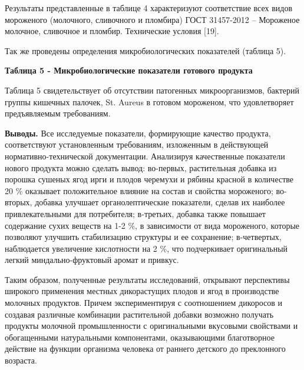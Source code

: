 {{Результаты представленные в таблице 4 характеризуют соответствие всех
видов мороженого (молочного, сливочного и пломбира) ГОСТ 31457-2012 --
Мороженое молочное, сливочное и пломбир. Технические условия {[}19{]}.

Так же проведены определения микробиологических показателей (таблица 5).

{\bfseries Таблица 5 - Микробиологические показатели готового продукта}


Таблица 5 свидетельствует об отсутствии патогенных микроорганизмов,
бактерий группы кишечных палочек, St. Aureus в готовом мороженом, что
удовлетворяет предъявляемым требованиям.

{\bfseries Выводы.} Все исследуемые показатели, формирующие качество
продукта, соответствуют установленным требованиям, изложенным в
действующей нормативно-технической документации. Анализируя качественные
показатели нового продукта можно сделать вывод: во-первых, растительная
добавка из порошка сушеных ягод ирги и плодов черемухи и рябины красной
в количестве 20 \% оказывает положительное влияние на состав и свойства
мороженого; во- вторых, добавка улучшает органолептические показатели,
сделав их наиболее привлекательными для потребителя; в-третьих, добавка
также повышает содержание сухих веществ на 1-2 \%, в зависимости от вида
мороженого, которые позволяют улучшить стабилизацию структуры и ее
сохранение; в-четвертых, наблюдается увеличение кислотности на 2 \%, что
подчеркивает оригинальный легкий миндально-фруктовый аромат и привкус.

Таким образом, полученные результаты исследований, открывают перспективы
широкого применения местных дикорастущих плодов и ягод в производстве
молочных продуктов. Причем экспериментируя с соотношением дикоросов и
создавая различные комбинации растительной добавки возможно получать
продукты молочной промышленности с оригинальными вкусовыми свойствами и
обогащенными натуральными компонентами, оказывающими благотворное
действие на функции организма человека от раннего детского до
преклонного возраста.

}}
